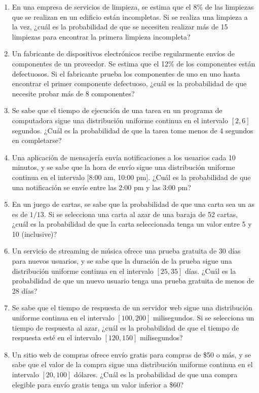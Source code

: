\begin{Ejer}
\begin{enumerate}
    \item En una empresa de servicios de limpieza, se estima que el 8\% de las limpiezas que se realizan en un edificio están incompletas. Si se realiza una limpieza a la vez, ¿cuál es la probabilidad de que se necesiten realizar más de 15 limpiezas para encontrar la primera limpieza incompleta?

    \item Un fabricante de dispositivos electrónicos recibe regularmente envíos de componentes de un proveedor. Se estima que el 12\% de los componentes están defectuosos. Si el fabricante prueba los componentes de uno en uno hasta encontrar el primer componente defectuoso, ¿cuál es la probabilidad de que necesite probar más de 8 componentes?

    \item Se sabe que el tiempo de ejecución de una tarea en un programa de computadora sigue una distribución uniforme continua en el intervalo $[2, 6]$ segundos. ¿Cuál es la probabilidad de que la tarea tome menos de 4 segundos en completarse?

    \item Una aplicación de mensajería envía notificaciones a los usuarios cada 10 minutos, y se sabe que la hora de envío sigue una distribución uniforme continua en el intervalo [8{:}00 am, 10{:}00 pm]. ¿Cuál es la probabilidad de que una notificación se envíe entre las 2{:}00 pm y las 3{:}00 pm?

    \item En un juego de cartas, se sabe que la probabilidad de que una carta sea un as es de $1/13$. Si se selecciona una carta al azar de una baraja de 52 cartas, ¿cuál es la probabilidad de que la carta seleccionada tenga un valor entre 5 y 10 (inclusive)?

    \item Un servicio de streaming de música ofrece una prueba gratuita de 30 días para nuevos usuarios, y se sabe que la duración de la prueba sigue una distribución uniforme continua en el intervalo $[25, 35]$ días. ¿Cuál es la probabilidad de que un nuevo usuario tenga una prueba gratuita de menos de 28 días?

    \item Se sabe que el tiempo de respuesta de un servidor web sigue una distribución uniforme continua en el intervalo $[100, 200]$ milisegundos. Si se selecciona un tiempo de respuesta al azar, ¿cuál es la probabilidad de que el tiempo de respuesta esté en el intervalo $[120, 150]$ milisegundos?

    \item Un sitio web de compras ofrece envío gratis para compras de \$50 o más, y se sabe que el valor de la compra sigue una distribución uniforme continua en el intervalo $[20, 100]$ dólares. ¿Cuál es la probabilidad de que una compra elegible para envío gratis tenga un valor inferior a \$60?

\end{enumerate}
\end{Ejer} 


